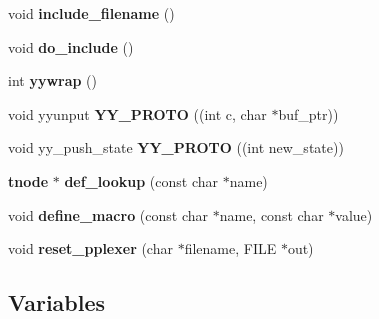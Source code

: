 \begin{CompactItemize}
\item 
void {\bf include\_\-filename} ()
\item 
void {\bf do\_\-include} ()
\item 
int {\bf yywrap} ()
\item 
void yyunput {\bf YY\_\-PROTO} ((int c, char $\ast$buf\_\-ptr))
\item 
void yy\_\-push\_\-state {\bf YY\_\-PROTO} ((int new\_\-state))
\item 
{\bf tnode} $\ast$ {\bf def\_\-lookup} (const char $\ast$name)
\item 
void {\bf define\_\-macro} (const char $\ast$name, const char $\ast$value)
\item 
void {\bf reset\_\-pplexer} (char $\ast$filename, FILE $\ast$out)
\end{CompactItemize}
\subsection*{Variables}
